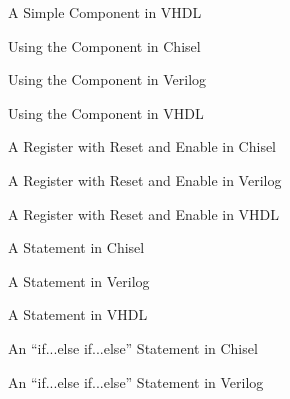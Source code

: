\begin{frame}[fragile]{A Simple Component in VHDL}
\end{frame}

\begin{frame}[fragile]{Using the  Component in Chisel}
\end{frame}

\begin{frame}[fragile]{Using the  Component in Verilog}
\end{frame}

\begin{frame}[fragile]{Using the  Component in VHDL}
\end{frame}

\begin{frame}[fragile]{A Register with Reset and Enable in Chisel}
\end{frame}

\begin{frame}[fragile]{A Register with Reset and Enable in Verilog}
\end{frame}

\begin{frame}[fragile]{A Register with Reset and Enable in VHDL}
\end{frame}

\begin{frame}[fragile]{A  Statement in Chisel}
\end{frame}

\begin{frame}[fragile]{A  Statement in Verilog}
\end{frame}

\begin{frame}[fragile]{A  Statement in VHDL}
\end{frame}

\begin{frame}[fragile]{An ``if...else  if...else'' Statement in Chisel}
\end{frame}

\begin{frame}[fragile]{An ``if...else  if...else'' Statement in Verilog}
\end{frame}

